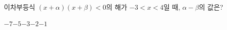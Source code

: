 이차부등식 $(x+\alpha)(x+\beta)<0$의 해가 $-3<x<4$일 때, $\alpha-\beta$의 값은? \cond{$\alpha<\beta$}
\begin{choices32}{$-7$}{$-5$}{$-3$}{$-2$}{$-1$}\end{choices32}
